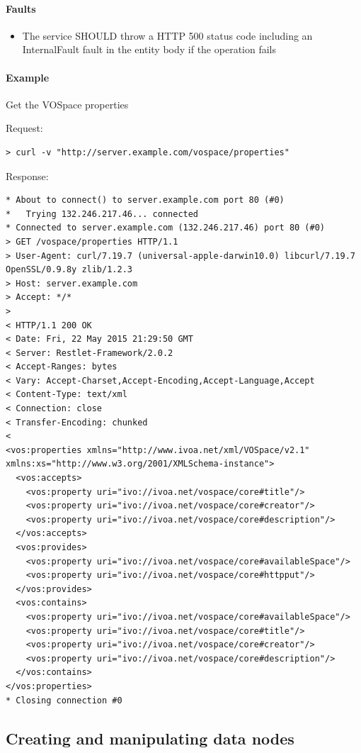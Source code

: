 \documentclass[11pt,a4paper]{ivoa}
\begin{document}
\paragraph{Faults}
\begin{itemize}
    \item The service SHOULD throw a HTTP 500 status code including an InternalFault fault in the entity body if the operation fails
\end{itemize}

\paragraph{Example}
Get the VOSpace properties

\noindent
Request:
\begin{lstlisting}
> curl -v "http://server.example.com/vospace/properties"
\end{lstlisting}
Response:
\begin{lstlisting}
* About to connect() to server.example.com port 80 (#0)
*   Trying 132.246.217.46... connected
* Connected to server.example.com (132.246.217.46) port 80 (#0)
> GET /vospace/properties HTTP/1.1
> User-Agent: curl/7.19.7 (universal-apple-darwin10.0) libcurl/7.19.7 OpenSSL/0.9.8y zlib/1.2.3
> Host: server.example.com
> Accept: */*
>
< HTTP/1.1 200 OK
< Date: Fri, 22 May 2015 21:29:50 GMT
< Server: Restlet-Framework/2.0.2
< Accept-Ranges: bytes
< Vary: Accept-Charset,Accept-Encoding,Accept-Language,Accept
< Content-Type: text/xml
< Connection: close
< Transfer-Encoding: chunked
<
<vos:properties xmlns="http://www.ivoa.net/xml/VOSpace/v2.1" xmlns:xs="http://www.w3.org/2001/XMLSchema-instance">
  <vos:accepts>
    <vos:property uri="ivo://ivoa.net/vospace/core#title"/>
    <vos:property uri="ivo://ivoa.net/vospace/core#creator"/>
    <vos:property uri="ivo://ivoa.net/vospace/core#description"/>
  </vos:accepts>
  <vos:provides>
    <vos:property uri="ivo://ivoa.net/vospace/core#availableSpace"/>
    <vos:property uri="ivo://ivoa.net/vospace/core#httpput"/>
  </vos:provides>
  <vos:contains>
    <vos:property uri="ivo://ivoa.net/vospace/core#availableSpace"/>
    <vos:property uri="ivo://ivoa.net/vospace/core#title"/>
    <vos:property uri="ivo://ivoa.net/vospace/core#creator"/>
    <vos:property uri="ivo://ivoa.net/vospace/core#description"/>
  </vos:contains>
</vos:properties>
* Closing connection #0
\end{lstlisting}

\subsection{Creating and manipulating data nodes}
\label{subsec:creating and manipulating data nodes}
\end{document}
